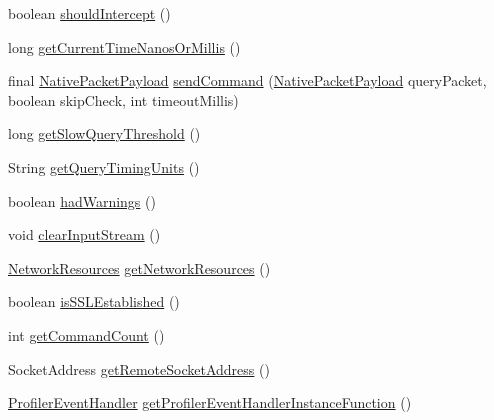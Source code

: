 \begin{DoxyCompactItemize}
\item 
boolean \mbox{\hyperlink{classcom_1_1mysql_1_1cj_1_1_native_session_af6ab4b22c01684f4ce3928c5e2315b06}{should\+Intercept}} ()
\item 
long \mbox{\hyperlink{classcom_1_1mysql_1_1cj_1_1_native_session_aa737fa8725527081fb414d39978e895a}{get\+Current\+Time\+Nanos\+Or\+Millis}} ()
\item 
final \mbox{\hyperlink{classcom_1_1mysql_1_1cj_1_1protocol_1_1a_1_1_native_packet_payload}{Native\+Packet\+Payload}} \mbox{\hyperlink{classcom_1_1mysql_1_1cj_1_1_native_session_aa4d084f0835dcbdfacc495070d84b8bf}{send\+Command}} (\mbox{\hyperlink{classcom_1_1mysql_1_1cj_1_1protocol_1_1a_1_1_native_packet_payload}{Native\+Packet\+Payload}} query\+Packet, boolean skip\+Check, int timeout\+Millis)
\item 
long \mbox{\hyperlink{classcom_1_1mysql_1_1cj_1_1_native_session_ae23927cce89ee197455c3524be0266b0}{get\+Slow\+Query\+Threshold}} ()
\item 
String \mbox{\hyperlink{classcom_1_1mysql_1_1cj_1_1_native_session_a04027209ae60e8be006fe2dfbdc727ed}{get\+Query\+Timing\+Units}} ()
\item 
boolean \mbox{\hyperlink{classcom_1_1mysql_1_1cj_1_1_native_session_a60f3ff60945cced4df0c1fa428f26b33}{had\+Warnings}} ()
\item 
void \mbox{\hyperlink{classcom_1_1mysql_1_1cj_1_1_native_session_ad60f0b285b73faff0c7bd2e43c7db5ad}{clear\+Input\+Stream}} ()
\item 
\mbox{\hyperlink{classcom_1_1mysql_1_1cj_1_1protocol_1_1_network_resources}{Network\+Resources}} \mbox{\hyperlink{classcom_1_1mysql_1_1cj_1_1_native_session_a2ddd406f0cb65786c48592f0a602f3d5}{get\+Network\+Resources}} ()
\item 
boolean \mbox{\hyperlink{classcom_1_1mysql_1_1cj_1_1_native_session_a0cb179e160997c904bc69c9f4a027433}{is\+S\+S\+L\+Established}} ()
\item 
int \mbox{\hyperlink{classcom_1_1mysql_1_1cj_1_1_native_session_a4c2f6058cbddf7348adeb5ba32618ea6}{get\+Command\+Count}} ()
\item 
Socket\+Address \mbox{\hyperlink{classcom_1_1mysql_1_1cj_1_1_native_session_a1b2b6019a770001c7d76252b458ac694}{get\+Remote\+Socket\+Address}} ()
\item 
\mbox{\hyperlink{interfacecom_1_1mysql_1_1cj_1_1log_1_1_profiler_event_handler}{Profiler\+Event\+Handler}} \mbox{\hyperlink{classcom_1_1mysql_1_1cj_1_1_native_session_a4c605e5c384e769ae780fb015d9a2da5}{get\+Profiler\+Event\+Handler\+Instance\+Function}} ()

\end{DoxyCompactItemize}
